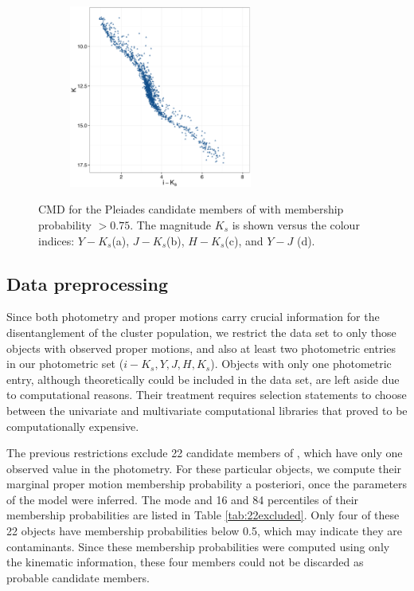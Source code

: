 \begin{figure}[ht!]
\begin{subfigure}[t]{0.45\textwidth}
    \end{subfigure}
     \begin{subfigure}[t]{0.45\textwidth}
      \includegraphics[page=5,height=6cm]{background/Figures/CIs.pdf}
        \caption{}
         
    \end{subfigure}
    \caption{CMD for the Pleiades candidate members of \citet{Bouy2015}  with membership probability $>0.75$. The magnitude $K_s$ is shown versus the colour indices: $Y-K_s$(a), $J-K_s$(b), $H-K_s$(c), and $Y-J$ (d).}
    \label{fig:otherCI}
\end{figure}

\subsection{Data preprocessing}

Since both photometry and proper motions carry crucial information for the disentanglement of the cluster population, we restrict the data set to only those objects with observed proper motions, and also at least two photometric entries in our photometric set ($i-K_s,Y,J,H,K_s$). Objects with only one photometric entry, although theoretically could be included in the data set, are left aside due to computational reasons. Their treatment requires selection statements to choose between the univariate and multivariate computational libraries that proved to be computationally expensive.

The previous restrictions exclude 22 candidate members of \citet{Bouy2015}, which have only one observed value in the photometry. For these particular objects, we compute their marginal proper motion membership probability a posteriori, once the parameters of the model were inferred. The mode and 16 and 84 percentiles of their membership probabilities are listed in Table \ref{tab:22excluded}. Only four of these 22 objects have membership probabilities below 0.5, which may indicate they are contaminants. Since these membership probabilities were computed using only the kinematic information, these four members could not be discarded as probable candidate members.

